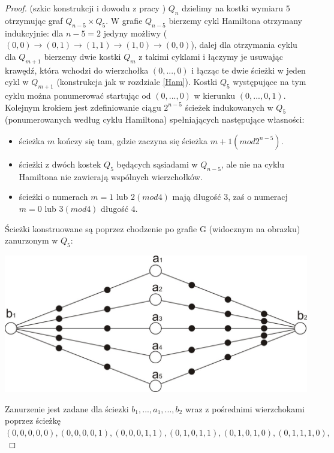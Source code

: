 \documentclass{pracamgr}
\begin{document}
     \begin{proof}(szkic konstrukcji i dowodu z pracy \cite{Snake2})
      $Q_n$ dzielimy na kostki wymiaru $5$ otrzymując graf $Q_{n-5}\times Q_5$. W grafie $Q_{n-5}$ bierzemy cykl Hamiltona otrzymany indukcyjnie:
      dla $n-5=2$ jedyny możliwy ($(0,0)\rightarrow(0,1)\rightarrow(1,1)\rightarrow(1,0)\rightarrow(0,0)$),
      dalej dla otrzymania cyklu dla $Q_{m+1}$ bierzemy dwie kostki $Q_m$ z takimi cyklami i łączymy je usuwając krawędź, która wchodzi do wierzchołka
      $(0,...,0)$ i łącząc te dwie ścieżki w jeden cykl w $Q_{m+1}$ (konstrukcja jak w rozdziale \ref{Ham}).
      Kostki $Q_5$ występujące na tym cyklu można ponumerować startując od $(0,...,0)$ w kierunku $(0,...,0,1)$.\newline
      Kolejnym krokiem jest zdefiniowanie ciągu $2^{n-5}$ ścieżek indukowanych w $Q_5$ (ponumerowanych według cyklu Hamiltona)
      spełniających następujące własności:
      \begin{itemize}
       \item ścieżka $m$ kończy się tam, gdzie zaczyna się ścieżka $m+1 (mod 2^{n-5})$.
       \item ścieżki z dwóch kostek $Q_5$ będących sąsiadami w $Q_{n-5}$, ale nie na cyklu Hamiltona nie zawierają wspólnych wierzchołków.
       \item ścieżki o numerach $m=1$ lub $2(mod 4)$ mają długość $3$, zaś o numeracj $m=0$ lub $3(mod 4)$ długość $4$.
      \end{itemize}
      Ścieżki konstruowane są poprzez chodzenie po grafie G (widocznym na obrazku) zanurzonym w $Q_5$:
      \begin{center}
       \includegraphics[scale=1]{img/snake_G.jpg}
      \end{center}
      Zanurzenie jest zadane dla ściezki $b_1,...,a_1,...,b_2$ wraz z pośrednimi wierzchokami poprzez ścieżkę
      $(0,0,0,0,0),(0,0,0,0,1),(0,0,0,1,1),(0,1,0,1,1),(0,1,0,1,0),(0,1,1,1,0),$\newline

\end{proof}
\end{document}
